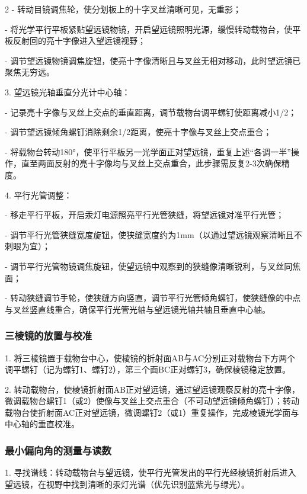 \documentclass[12pt,a4paper]{article}
\begin{document}
\begin{multicols}{2}
       - 转动目镜调焦轮，使分划板上的十字叉丝清晰可见，无重影；

       - 将光学平行平板紧贴望远镜物镜，开启望远镜照明光源，缓慢转动载物台，使平板反射回的亮十字像进入望远镜视野；

       - 调节望远镜物镜调焦旋钮，使亮十字像清晰且与叉丝无相对移动，此时望远镜已聚焦无穷远。

    3. 望远镜光轴垂直分光计中心轴：

       - 记录亮十字像与叉丝上交点的垂直距离，调节载物台调平螺钉使距离减小1/2；

       - 调节望远镜倾角螺钉消除剩余1/2距离，使亮十字像与叉丝上交点重合；

       - 将载物台转动180°，使平行平板另一光学面正对望远镜，重复上述“各调一半”操作，直至两面反射的亮十字像均与叉丝上交点重合，此步骤需反复2-3次确保精度。

    4. 平行光管调整：

       - 移走平行平板，开启汞灯电源照亮平行光管狭缝，将望远镜对准平行光管；

       - 调节平行光管狭缝宽度旋钮，使狭缝宽度约为1mm（以通过望远镜观察清晰且不刺眼为宜）；

       - 调节平行光管物镜调焦旋钮，使望远镜中观察到的狭缝像清晰锐利，与叉丝同焦面；

       - 转动狭缝调节手轮，使狭缝方向竖直，调节平行光管倾角螺钉，使狭缝像的中点与叉丝竖直线重合，确保平行光管光轴与望远镜光轴共轴且垂直中心轴。



    \subsubsection{\kaishu 三棱镜的放置与校准}

    1. 将三棱镜置于载物台中心，使棱镜的折射面AB与AC分别正对载物台下方两个调平螺钉（记为螺钉1、螺钉2），第三个面BC正对螺钉3，确保棱镜稳定放置。

    2. 转动载物台，使棱镜折射面AB正对望远镜，通过望远镜观察反射的亮十字像，微调载物台螺钉1（或2）使像与叉丝上交点重合（不可动望远镜倾角螺钉）；转动载物台使折射面AC正对望远镜，微调螺钉2（或1）重复操作，完成棱镜光学面与中心轴的垂直校准。



    \subsubsection{\kaishu 最小偏向角的测量与读数}

    1. 寻找谱线：转动载物台与望远镜，使平行光管发出的平行光经棱镜折射后进入望远镜，在视野中找到清晰的汞灯光谱（优先识别蓝紫光与绿光）。


\end{multicols}
\end{document}
